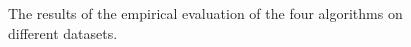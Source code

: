 \begin{figure}
{  }
  \newline \newline
  \label{fig:results}
  \caption{The results of the empirical evaluation of the four algorithms on different datasets.}
\end{figure}
